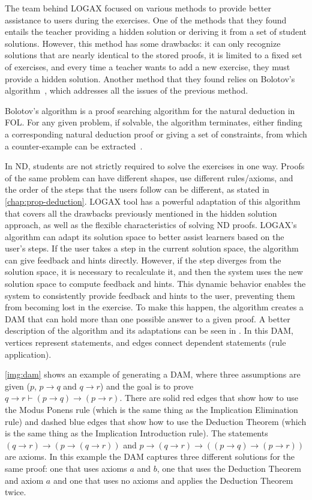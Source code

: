 The team behind LOGAX focused on various methods to provide better assistance to users during the exercises. One of the methods that they found entails the teacher providing a hidden solution or deriving it from a set of student solutions. However, this method has some drawbacks: it can only recognize solutions that are nearly identical to the stored proofs, it is limited to a fixed set of exercises, and every time a teacher wants to add a new exercise, they must provide a hidden solution. Another method that they found relies on Bolotov's algorithm~\cite{bolotov_2005_automated}, which addresses all the issues of the previous method.

Bolotov's algorithm is a proof searching algorithm for the natural deduction in \gls{FOL}.
For any given problem, if solvable, the algorithm terminates, either finding a corresponding natural deduction proof or giving a set of constraints, from which a counter-example can be extracted~\cite{bolotov_2005_automated}.

In \gls{ND}, students are not strictly required to solve the exercises in one way. Proofs of the same problem can have different shapes, use different rules/axioms, and the order of the steps that the users follow can be different, as stated in \autoref{chap:prop-deduction}. LOGAX tool has a powerful adaptation of this algorithm that covers all the drawbacks previously mentioned in the hidden solution approach, as well as the flexible characteristics of solving \gls{ND} proofs. LOGAX's algorithm can adapt its solution space to better assist learners based on the user's steps. If the user takes a step in the current solution space, the algorithm can give feedback and hints directly. However, if the step diverges from the solution space, it is necessary to recalculate it, and then the system uses the new solution space to compute feedback and hints. This dynamic behavior enables the system to consistently provide feedback and hints to the user, preventing them from becoming lost in the exercise. To make this happen, the algorithm creates a \gls{DAM} that can hold more than one possible answer to a given proof. A better description of the algorithm and its adaptations can be seen in \cite{lodder_2020_generation, bolotov_2005_automated}. In this \gls{DAM}, vertices represent statements, and edges connect dependent statements (rule application).

\autoref{img:dam} shows an example of generating a \gls{DAM}, where three assumptions are given (\(p\), \(p \to q\) and \(q \to r\)) and the goal is to prove \( q \to r \vdash (p \to q) \to (p \to r) \). There are solid red edges that show how to use the Modus Ponens rule (which is the same thing as the Implication Elimination rule) and dashed blue edges that show how to use the Deduction Theorem (which is the same thing as the Implication Introduction rule). The statements \((q \to r) \to (p \to (q \to r)) \) and \( p \to (q \to r) \to ((p \to q) \to (p \to r)) \) are axioms. In this example the \gls{DAM} captures three different solutions for the same proof: one that uses axioms \(a\) and \(b\), one that uses the Deduction Theorem and axiom \(a\) and one that uses no axioms and applies the Deduction Theorem twice.

